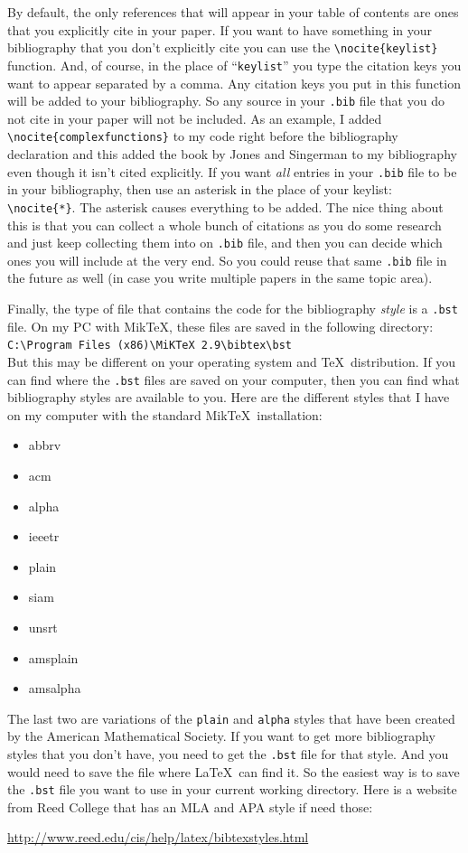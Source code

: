 \documentclass{article}
\newcommand{\nid}{\noindent} %
\begin{document}
By default, the only references that will appear in your table of contents are ones that you explicitly cite in your paper.  If you want to have something in your bibliography that you don't explicitly cite you can use the \verb|\nocite{keylist}| function.  And, of course, in the place of ``\texttt{keylist}'' you type the citation keys you want to appear separated by a comma.  Any citation keys you put in this function will be added to your bibliography.  So any source in your \verb|.bib| file that you do not cite in your paper will not be included.  As an example, I added \verb|\nocite{complexfunctions}| to my code right before the bibliography declaration and this added the book by Jones and Singerman to my bibliography even though it isn't cited explicitly.  If you want \emph{all} entries in your \verb|.bib| file to be in your bibliography, then use an asterisk in the place of your keylist: \verb|\nocite{*}|.  The asterisk causes everything to be added.    The nice thing about this is that you can collect a whole bunch of citations as you do some research and just keep collecting them into on \verb|.bib| file, and then you can decide which ones you will include at the very end.  So you could reuse that same \verb|.bib| file in the future as well (in case you write multiple papers in the same topic area).

Finally, the type of file that contains the code for the bibliography \emph{style} is a \verb|.bst| file.  On my PC with Mik\TeX, these files are saved in the following directory:\\

\verb|C:\Program Files (x86)\MiKTeX 2.9\bibtex\bst|\\

\nid But this may be different on your operating system and \TeX\ distribution. If you can find where the \verb|.bst| files are saved on your computer, then you can find what bibliography styles are available to you.  Here are the different styles that I have on my computer with the standard Mik\TeX\ installation:
\begin{multicols}{3}
\begin{itemize}
\item abbrv
\item acm
\item alpha
\item ieeetr
\item plain
\item siam
\item unsrt
\item amsplain
\item amsalpha
\end{itemize}
\end{multicols}
\nid The last two are variations of the \texttt{plain} and \texttt{alpha} styles that have been created by the American Mathematical Society.  If you want to get more bibliography styles that you don't have, you need to get the \verb|.bst| file for that style.  And you would need to save the file where \LaTeX\ can find it.  So the easiest way is to save the \verb|.bst| file you want to use in your current working directory.  Here is a website from Reed College that has an MLA and APA style if need those:

\url{http://www.reed.edu/cis/help/latex/bibtexstyles.html}

\newpage

\nocite{complexfunctions}


\end{document}
